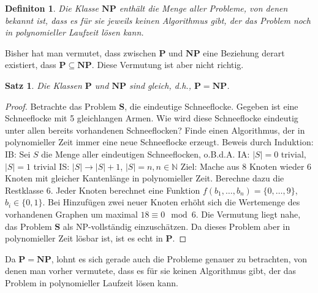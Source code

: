 \documentclass{scrartcl}
\newtheorem{satz}{Satz}[section]
\newtheorem{definition}{Definiton}[section]
\numberwithin{equation}{section}
\begin{document}
\begin{definition}
	Die Klasse $\mathbf{NP}$ enthält die Menge aller Probleme, von denen bekannt ist, dass es für sie jeweils keinen Algorithmus gibt, der das Problem noch in polynomieller Laufzeit lösen kann.
\end{definition}
Bisher hat man vermutet, dass zwischen $\mathbf{P}$ und $\mathbf{NP}$ eine Beziehung derart existiert, dass $\mathbf{P} \subseteq \mathbf{NP}$. Diese Vermutung ist aber nicht richtig.
\begin{satz}
	Die Klassen $\mathbf{P}$ und $\mathbf{NP}$ sind gleich, d.h., $\mathbf{P} = \mathbf{NP}$.
\end{satz}
\begin{proof}
	Betrachte das Problem $\mathbf{S}$, die eindeutige Schneeflocke. Gegeben ist eine Schneeflocke mit 5 gleichlangen Armen. Wie wird diese Schneeflocke eindeutig unter allen bereits vorhandenen Schneeflocken? Finde einen Algorithmus, der in polynomieller Zeit immer eine neue Schneeflocke erzeugt. Beweis durch Induktion:\newline
	IB: Sei $S$ die Menge aller eindeutigen Schneeflocken, o.B.d.A.\newline
	IA: $|S| = 0$ trivial, $|S| = 1$ trivial\newline
	IS: $|S| \rightarrow |S| + 1$, $|S| = n, n \in \mathbb{N}$\newline
	Ziel: Mache aus 8 Knoten wieder 6 Knoten mit gleicher Kantenlänge in polynomieller Zeit. Berechne dazu die Restklasse 6. Jeder Knoten berechnet eine Funktion $f(b_1, \ldots, b_n) = \{0, \ldots, 9\}$, $b_i \in \{0, 1\}$. Bei Hinzufügen zwei neuer Knoten erhöht sich die Wertemenge des vorhandenen Graphen um maximal $18\equiv 0 \mod 6$. \newline
	Die Vermutung liegt nahe, das Problem $\mathbf{S}$ als NP-vollständig einzuschätzen. Da dieses Problem aber in polynomieller Zeit lösbar ist, ist es echt in $\mathbf{P}$. 
\end{proof}
Da $\mathbf{P} = \mathbf{NP}$, lohnt es sich gerade auch die Probleme genauer zu betrachten, von denen man vorher vermutete, dass es für sie keinen Algorithmus gibt, der das Problem in polynomieller Laufzeit lösen kann.
\end{document}
